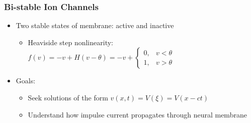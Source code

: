 \documentclass{beamer}
\begin{document}
\begin{frame}
\frametitle{Bi-stable Ion Channels}
\begin{itemize}
\item Two stable states of membrane: active and inactive
	\begin{itemize}
		\item Heaviside step nonlinearity: $f(v)=-v+H(v-\theta)=-v+
		\begin{cases}
    		0, & \text{$v<\theta$}\\
    		1, & \text{$v>\theta$}
  		\end{cases}$
	\end{itemize}
\item Goals: 
	\begin{itemize}
		\item Seek solutions of the form $v(x,t)=V(\xi)=V(x-ct)$
		\item Understand how impulse current propagates through neural membrane
	\end{itemize}
\end{itemize}
\end{frame}
\end{document}
